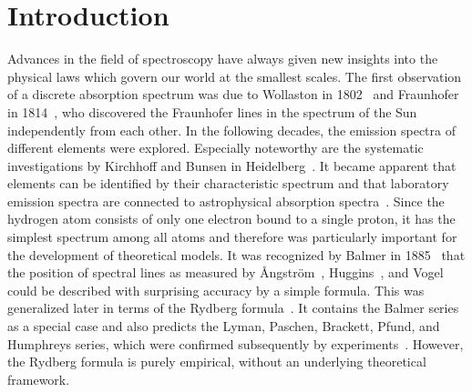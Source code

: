 \chapter*{Introduction}
Advances in the field of spectroscopy have always given new insights into the physical laws which govern our world at the smallest scales. %
The first observation of a discrete absorption spectrum was due to Wollaston in 1802~\cite{wollaston1802} and Fraunhofer in 1814~\cite{fraunhofer1817}, who discovered the Fraunhofer lines in the spectrum of the Sun independently from each other.
In the following decades, the emission spectra of different elements were explored. Especially noteworthy are the systematic investigations by Kirchhoff and Bunsen in Heidelberg~\cite{kirchhoff1860,kirchhoff1861}. It became apparent that elements can be identified by their characteristic spectrum and that laboratory emission spectra are connected to astrophysical absorption spectra~\cite{angstrom1862}.
Since the hydrogen atom consists of only one electron bound to a single proton, it has the simplest spectrum among all atoms and therefore was particularly important for the development of theoretical models. It was recognized by Balmer in 1885~\cite{balmer1885} that the position of spectral lines as measured by Ångström~\cite{angstrom1853}, Huggins~\cite{huggins1880}, and Vogel~\cite{vogel1880} could be described with surprising accuracy by a simple formula. This was generalized later in terms of the Rydberg formula~\cite{rydberg1889,martinson2005}. It contains the Balmer series as a special case and also predicts the Lyman, Paschen, Brackett, Pfund, and Humphreys series, which were confirmed subsequently by experiments~\cite{lyman1906,paschen1908,brackett1922,pfund1924,humphrey1953}. However, the Rydberg formula is purely empirical, without an underlying theoretical framework.

